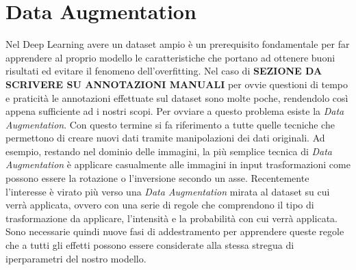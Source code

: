 \section{Data Augmentation}
\label{sec:data_augmentation}
Nel Deep Learning avere un dataset ampio è un prerequisito fondamentale per far apprendere al proprio modello le caratteristiche che portano ad ottenere buoni risultati ed evitare il fenomeno dell'overfitting. Nel caso di \textbf{SEZIONE DA SCRIVERE SU ANNOTAZIONI MANUALI} per ovvie questioni di tempo e praticità le annotazioni effettuate sul dataset sono molte poche, rendendolo così appena sufficiente ad i nostri scopi. Per ovviare a questo problema esiste la \textit{Data Augmentation}. Con questo termine si fa riferimento a tutte quelle tecniche che permettono di creare nuovi dati tramite manipolazioni dei dati originali. Ad esempio, restando nel dominio delle immagini, la più semplice tecnica di \textit{Data Augmentation} è applicare casualmente alle immagini in input trasformazioni come possono essere la rotazione o l'inversione secondo un asse. Recentemente l'interesse è virato più verso una \textit{Data Augmentation} mirata al dataset su cui verrà applicata, ovvero con una serie di regole che comprendono il tipo di trasformazione da applicare, l'intensità e la probabilità con cui verrà applicata. Sono necessarie quindi nuove fasi di addestramento per apprendere queste regole che a tutti gli effetti possono essere considerate alla stessa stregua di iperparametri del nostro modello.
